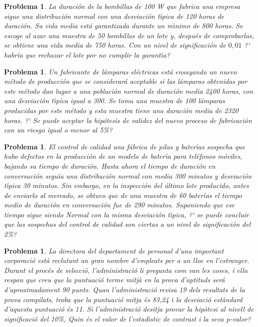 \documentclass[11pt]{article}
\newcounter{prbcont}
\newtheorem{problema}[prbcont]{Problema}
\begin{document}
\begin{problema}
La duraci\'on de la bombillas de 100 W que fabrica una empresa sigue una distribuci\'on normal con una desviaci\'on t\'{\i}pica de 120 horas de duraci\'on. Su vida media est\'a garantizada durante un m\'{\i}nimo de 800 horas. Se escoge al azar una muestra de 50 bombillas de un lote y, despu\'es de comprobarlas, se obtiene una vida media de 750 horas. Con un nivel de significaci\'on de $0,01$ ?` habr\'{\i}a que rechazar el lote por no cumplir la garant\'{\i}a?
\end{problema}

\begin{problema}
Un fabricante de l\'amparas el\'ectricas est\'a ensayando un nuevo m\'etodo de producci\'on que se considerar\'a aceptable si las l\'amparas obtenidas por este m\'etodo dan lugar a una poblaci\'on normal de duraci\'on media 2400 horas, con una desviaci\'on t\'{\i}pica igual a 300. Se toma una muestra de 100 l\'amparas producidas por este m\'etodo y esta muestra tiene una duraci\'on media de 2320 horas. ?` Se puede aceptar la hip\'otesis de validez del nuevo proceso de fabricaci\'on con un riesgo igual o menor al 5\%?
\end{problema}

\begin{problema}
El control de calidad una f\'abrica de pilas y bater\'{\i}as sospecha que hubo defectos en la producci\'on de un modelo de bater\'{\i}a para tel\'efonos m\'oviles, bajando su tiempo de duraci\'on. Hasta ahora el tiempo de duraci\'on en conversaci\'on segu\'{\i}a una distribuci\'on normal con media 300 minutos y desviaci\'on t\'{\i}pica 30 minutos. Sin embargo, en la inspecci\'on del \'ultimo lote producido, antes de enviarlo al mercado, se obtuvo que de una muestra de 60 bater\'{\i}as el tiempo medio de duraci\'on en conversaci\'on fue de 290 minutos. Suponiendo que ese tiempo sigue siendo Normal con la misma desviaci\'on t\'{\i}pica, ?` se puede concluir que las sospechas del control de calidad son ciertas a un nivel de significaci\'on del 2\%?
\end{problema}

\begin{problema}
La directora del departament de personal d'una important corporaci\'o est\`a reclutant un gran nombre d'empleats per a un lloc en l'estranger. Durant el proc\'es de selecci\'o, l'administraci\'o li pregunta com van les coses, i ella respon que creu que la puntuaci\'o terme mitj\`a en la prova d'aptituds ser\'a d'aproximadament 90 punts. Quan l'administraci\'o revisa 19 dels resultats de la prova compilats, troba que la puntuaci\'o mitja \'es 83,24 i la desviaci\'o est\`andard d'aquesta puntuaci\'o \'es 11. Si l'administraci\'o desitja provar la hip\`otesi al nivell de significaci\'o del 10\%, Quin \'es el valor de l'estad\'{\i}stic de contrast i la seva p-valor?
\end{problema}
\end{document}
